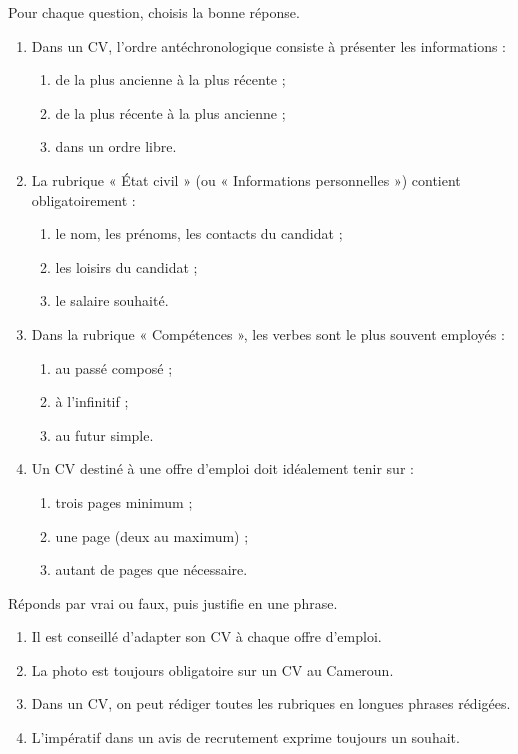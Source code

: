 \documentclass[11pt]{article}
\newcommand{\cle}[1]{{\popxbold\color{popdark}#1}}
\begin{document}
\begin{exercice}
Pour chaque question, choisis la bonne réponse.
\begin{enumerate}
\item Dans un CV, l'ordre \cle{antéchronologique} consiste à présenter les informations :
\begin{enumerate}
\item de la plus ancienne à la plus récente ;
\item de la plus récente à la plus ancienne ;
\item dans un ordre libre.
\end{enumerate}
\item La rubrique « État civil » (ou « Informations personnelles ») contient obligatoirement :
\begin{enumerate}
\item le nom, les prénoms, les contacts du candidat ;
\item les loisirs du candidat ;
\item le salaire souhaité.
\end{enumerate}
\item Dans la rubrique « Compétences », les verbes sont le plus souvent employés :
\begin{enumerate}
\item au passé composé ;
\item à l'infinitif ;
\item au futur simple.
\end{enumerate}
\item Un CV destiné à une offre d'emploi doit idéalement tenir sur :
\begin{enumerate}
\item trois pages minimum ;
\item une page (deux au maximum) ;
\item autant de pages que nécessaire.
\end{enumerate}
\end{enumerate}
\end{exercice}

\begin{exercice}
Réponds par vrai ou faux, puis justifie en une phrase.
\begin{enumerate}
\item Il est conseillé d'adapter son CV à chaque offre d'emploi.
\item La photo est toujours obligatoire sur un CV au Cameroun.
\item Dans un CV, on peut rédiger toutes les rubriques en longues phrases rédigées.
\item L'impératif dans un avis de recrutement exprime toujours un souhait.
\end{enumerate}
\end{exercice}
\end{document}
